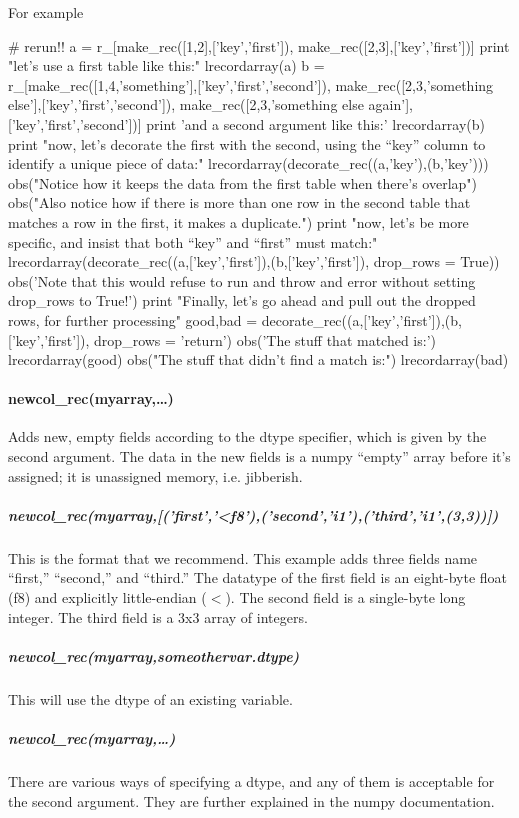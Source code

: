 For example
\begin{python}
# rerun!!
a = r_[make_rec([1,2],['key','first']),
    make_rec([2,3],['key','first'])]
print "let's use a first table like this:"
lrecordarray(a)
b = r_[make_rec([1,4,'something'],['key','first','second']),
    make_rec([2,3,'something else'],['key','first','second']),
    make_rec([2,3,'something else again'],['key','first','second'])]
print 'and a second argument like this:'
lrecordarray(b)
print "now, let's decorate the first with the second, using the ``key'' column to identify a unique piece of data:"
lrecordarray(decorate_rec((a,'key'),(b,'key')))
obs("Notice how it keeps the data from the first table when there's overlap\n\n")
obs("Also notice how if there is more than one row in the second table that matches a row in the first, it makes a duplicate.")
print "now, let's be more specific, and insist that both ``key'' and ``first'' must match:"
lrecordarray(decorate_rec((a,['key','first']),(b,['key','first']),
    drop_rows = True))
obs('Note that this would refuse to run and throw and error without setting drop\_rows to True!')
print "Finally, let's go ahead and pull out the dropped rows, for further processing" 
good,bad = decorate_rec((a,['key','first']),(b,['key','first']),
    drop_rows = 'return')
obs('The stuff that matched is:')
lrecordarray(good)
obs("The stuff that didn't find a match is:")
lrecordarray(bad)
\end{python}
\paragraph{newcol\_rec(myarray,\ldots)}
Adds new, empty fields according to the dtype specifier,
    which is given by the second argument.
The data in the new fields is a numpy ``empty'' array
    before it's assigned;
    it is unassigned memory,
    i.e. jibberish.

\subparagraph{newcol\_rec(myarray,[('first','<f8'),('second','i1'),('third','i1',(3,3))])}
This is the format that we recommend.
This example adds three fields name ``first,'' ``second,'' and ``third.'' 
The datatype of the first field is an eight-byte float (f8) and explicitly
    little-endian ($<$).
The second field is a single-byte long integer.
The third field is a 3x3 array of integers.

\subparagraph{newcol\_rec(myarray,someothervar.dtype)}
This will use the dtype of an existing variable.

\subparagraph{newcol\_rec(myarray,\ldots)}
There are various ways of specifying a dtype, and any of them is acceptable
    for the second argument.
They are further explained in the numpy documentation.

